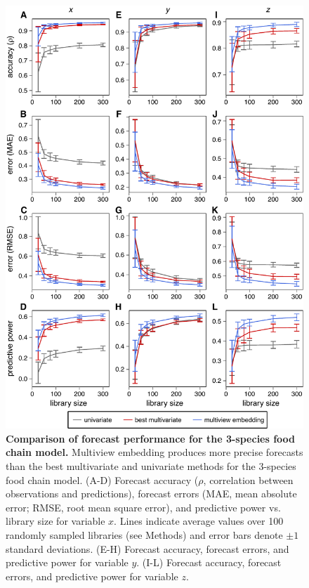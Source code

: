 \begin{figure}[!ht]
\begin{center}\includegraphics[scale = 0.65]{fig_multiembed_ed_2.pdf}\end{center}
\caption[Comparison of forecast performance for the 3-species food chain model.]{\textbf{Comparison of forecast performance for the 3-species food chain model.}\newline
Multiview embedding produces more precise forecasts than the best multivariate and univariate methods for the 3-species food chain model. (A-D) Forecast accuracy ($\rho$, correlation between observations and predictions), forecast errors (MAE, mean absolute error; RMSE, root mean square error), and predictive power vs. library size for variable $x$. Lines indicate average values over 100 randomly sampled libraries (see Methods) and error bars denote $\pm 1$ standard deviations. (E-H) Forecast accuracy, forecast errors, and predictive power for variable $y$. (I-L) Forecast accuracy, forecast errors, and predictive power for variable $z$.}
\label{fig_multiembed_ed_2}
\end{figure}

